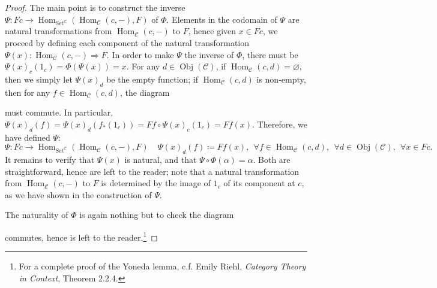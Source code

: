 \documentclass{article}
\theoremstyle{definition}
\theoremstyle{definition}
\theoremstyle{remark}
\DeclareMathOperator{\Obj}{Obj}
\DeclareMathOperator{\Hom}{Hom}
\begin{document}
	\begin{proof}
		The main point is to construct the inverse $\Psi:Fc\to\Hom_\mathcal{\mathrm{Set}^\mathcal{C}}(\Hom_\mathcal{C}(c,-),F)$ of $\Phi$. Elements in the codomain of $\Psi$ are natural transformations from $\Hom_\mathcal{C}(c,-)$ to $F$, hence given $x\in Fc$, we proceed by defining each component of the natural transformation $\Psi(x):\Hom_\mathcal{C}(c,-)\Rightarrow F$. In order to make $\Psi$ the inverse of $\Phi$, there must be $\Psi(x)_c(1_c)=\Phi(\Psi(x))=x$. For any $d\in\Obj(\mathcal{C})$, if $\Hom_\mathcal{C}(c,d)=\varnothing$, then we simply let $\Psi(x)_d$ be the empty function; if $\Hom_\mathcal{C}(c,d)$ is non-empty, then for any $f\in\Hom_\mathcal{C}(c,d)$, the diagram
		\begin{center}
			\end{center}
			must commute. In particular, $\Psi(x)_d(f)=\Psi(x)_d(f_*(1_c))=Ff\circ\Psi(x)_c(1_c)=Ff(x)$. Therefore, we have defined $\Psi$:
			\[\Psi:Fc\to\Hom_{\mathrm{Set}^\mathcal{C}}(\Hom_\mathcal{C}(c,-),F)\ \ \ \ \ \Psi(x)_d(f)\coloneqq Ff(x),\ \ \forall f\in\Hom_\mathcal{C}(c,d),\ \ \forall d\in\Obj(\mathcal{C}),\ \ \forall x\in Fc.\]
			It remains to verify that $\Psi(x)$ is natural, and that $\Psi\circ\Phi(\alpha)=\alpha$. Both are straightforward, hence are left to the reader; note that a natural transformation from $\Hom_\mathcal{C}(c,-)$ to $F$ is determined by the image of $1_c$ of its component at $c$, as we have shown in the construction of $\Psi$.\par
			The naturality of $\Phi$ is again nothing but to check the diagram
			\begin{center}
			\end{center}
			commutes, hence is left to the reader.\footnote{For a complete proof of the Yoneda lemma, c.f. Emily Riehl, \textsl{Category Theory in Context}, Theorem 2.2.4.}
	\end{proof}
\end{document}
